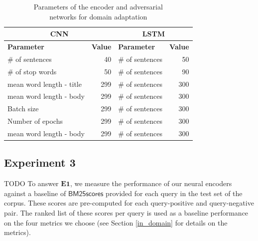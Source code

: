 \documentclass{sigkddExp}
\begin{document}
\begin{table}[h]
    \begin{tabular}{l|r|l|r}
          \multicolumn{2}{c|}{\textbf{CNN}}
         & \multicolumn{2}{c}{\textbf{LSTM}}
         \\
         \toprule
         \textbf{Parameter}
         & \textbf{Value}
         & \textbf{Parameter}
         & \textbf{Value}
         \\
         \midrule
         \# of sentences
         & 40
         & \# of sentences
         & 50
         \\
         \# of stop words 
         & 50
         & \# of sentences
         & 90
         \\
         mean word length - title
         & 299
         & \# of sentences
         & 300
         \\
         mean word length - body
         & 299
         & \# of sentences
         & 300
         \\
         Batch size
         & 299
         & \# of sentences
         & 300
         \\
         Number of epochs
         & 299
         & \# of sentences
         & 300
         \\
         mean word length - body
         & 299
         & \# of sentences
         & 300
    \end{tabular}
    \caption{Parameters of the encoder and adversarial\protect\\ networks for domain adaptation}
    \label{tab:param_indomain}
\end{table}



\subsection{Experiment 3}
{\color{red} TODO}
To answer $\mathbf{E1}$, we measure the performance of our neural encoders against a baseline of $\mathsf{BM25 scores}$ provided for each query in the test set of the corpus. These scores are pre-computed for each query-positive and query-negative pair. The ranked list of these scores per query is used as a baseline performance on the four metrics we choose (see Section \ref{in_domain} for details on the metrics).
\end{document}
